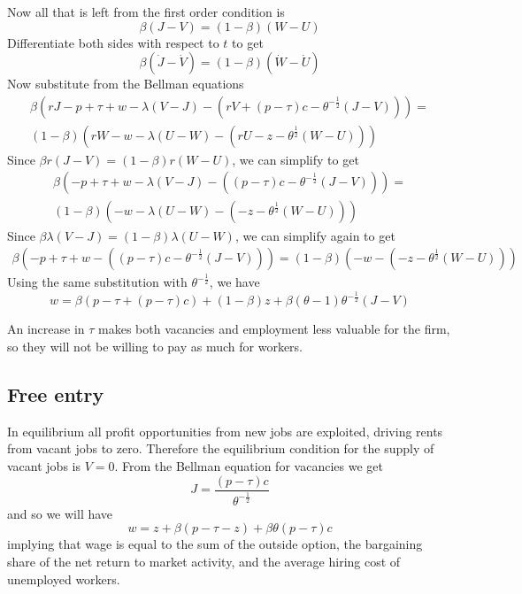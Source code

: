 \documentclass[11pt]{amsart}
\begin{document}
Now all that is left from the first order condition is
\[
\beta (J-V) = (1-\beta) (W - U)
\]
Differentiate both sides with respect to $t$ to get
\[
\beta (\dot{J}-\dot{V}) = (1-\beta) (\dot{W} - \dot{U})
\]
Now substitute from the Bellman equations
\begin{align*}
\beta(rJ - p + \tau + w - \lambda (V-J) - (rV + (p - \tau)c - \theta^{-\frac{1}{2}} (J - V))) = \\(1-\beta) (rW - w - \lambda(U-W) - (rU - z - \theta^{\frac{1}{2}} (W - U)))
\end{align*}
Since $\beta r (J-V) = (1-\beta) r (W-U)$, we can simplify to get
\begin{align*}
\beta( - p + \tau + w - \lambda (V-J) - ((p - \tau)c - \theta^{-\frac{1}{2}} (J - V))) = \\(1-\beta) ( - w - \lambda(U-W) - ( - z - \theta^{\frac{1}{2}} (W - U)))
\end{align*}
Since $\beta \lambda (V-J) = (1-\beta) \lambda (U-W)$, we can simplify again to get
\begin{align*}
\beta( - p + \tau + w  - ((p - \tau)c - \theta^{-\frac{1}{2}} (J - V))) = (1-\beta) ( - w  - ( - z - \theta^{\frac{1}{2}} (W - U)))
\end{align*}
Using the same substitution with $\theta^{-\frac{1}{2}}$, we have
\begin{equation}
w = \beta (p - \tau + (p - \tau)c) + (1-\beta) z + \beta (\theta - 1) \theta^{-\frac{1}{2}} (J-V)
\end{equation}

An increase in $\tau$ makes both vacancies and employment less valuable for the firm, so they will not be willing to pay as much for workers.


\subsection{Free entry}

In equilibrium all profit opportunities from new jobs are exploited, driving rents from vacant jobs to zero. Therefore the equilibrium condition for the supply of vacant jobs is $V = 0$. From the Bellman equation for vacancies we get
\[
J = \frac{(p-\tau)c}{\theta^{-\frac{1}{2}}}
\]
and so we will have
\begin{equation}
w = z + \beta(p-\tau-z) + \beta \theta (p - \tau) c
\end{equation}
implying that wage is equal to the sum of the outside option, the bargaining share of the net return to market activity, and the average hiring cost of unemployed workers.
\end{document}
